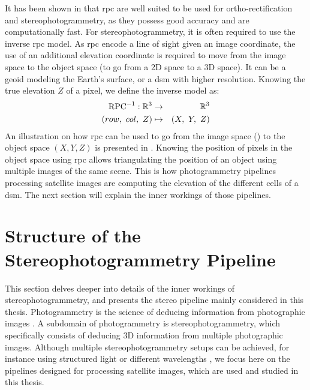 It has been shown in \cite{baltsavias_metric_1992} that \acrshort{rpc} are well suited to be used for ortho-rectification and stereophotogrammetry, as they possess good accuracy and are computationally fast. For stereophotogrammetry, it is often required to use the inverse \acrshort{rpc} model. As \acrshort{rpc} encode a line of sight given an image coordinate, the use of an additional elevation coordinate is required to move from the image space to the object space (\ie to go from a 2D space to a 3D space). It can be a geoid modeling the Earth's surface, or a \acrshort{dsm} with higher resolution. Knowing the true elevation $Z$ of a pixel, we define the inverse model as:
\begin{eqnarray}
    \mathrm{RPC}^{-1}:\mathbb{R}^3 &\rightarrow&\mathbb{R}^3\nonumber\\
    (row, ~col,~Z) 	&\mapsto& (X,~Y,~Z) \label{eq:inverse_rpc}
\end{eqnarray}
An illustration on how \acrshort{rpc} can be used to go from the image space (\rowcol) to the object space $(X,Y,Z)$ is presented in . Knowing the position of pixels in the object space using \acrshort{rpc} allows triangulating the position of an object using multiple images of the same scene. This is how photogrammetry pipelines processing satellite images are computing the elevation of the different cells of a \acrshort{dsm}. The next section will explain the inner workings of those pipelines.

\section{Structure of the Stereophotogrammetry Pipeline}\label{sec:classical_stero_pipeline}
This section delves deeper into details of the inner workings of stereophotogrammetry, and presents the stereo pipeline mainly considered in this thesis. Photogrammetry is the science of deducing information from photographic images \cite{kasser_photogrammetrie_2001}. A subdomain of photogrammetry is stereophotogrammetry, which specifically consists of deducing 3D information from multiple photographic images. Although multiple stereophotogrammetry setups can be achieved, for instance using structured light \cite{scharstein_high-accuracy_2003} or different wavelengths \cite{geng_rainbow_1996}, we focus here on the pipelines designed for processing satellite images, which are used and studied in this thesis. 



